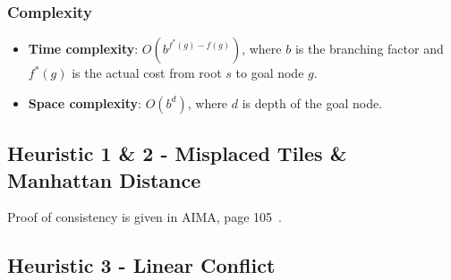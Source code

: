 \documentclass{llncs}
\begin{document}
\subsubsection{Complexity}
\begin{itemize}
	\item[] \textbf{Time complexity}: $O(b^{f^*(g)-f(g)})$, where $b$ is the branching factor and $f^*(g)$ is the actual cost from root $s$ to goal node $g$.
	\item[] \textbf{Space complexity}: $O(b^d)$, where $d$ is depth of the goal node.
\end{itemize}

\subsection{Heuristic 1 \& 2 - Misplaced Tiles \& Manhattan Distance}

Proof of consistency is given in AIMA, page 105~\cite{aima}.

\subsection{Heuristic 3 - Linear Conflict}
\end{document}
